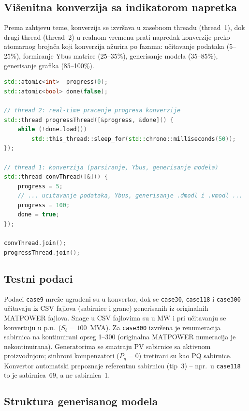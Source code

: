 \documentclass[12pt,oneside, a4paper]{book}
\begin{document}
\subsection{Višenitna konverzija sa indikatorom napretka}
 
Prema zahtjevu teme, konverzija se izvršava u zasebnom threadu (thread~1),
dok drugi thread (thread~2) u realnom vremenu prati napredak konverzije preko
atomarnog brojača koji konverzija ažurira po fazama: učitavanje podataka
(5--25\%), formiranje Ybus matrice (25--35\%), generisanje modela
(35--85\%), generisanje grafika (85--100\%).
 
\begin{lstlisting}[language=C++, style=cppstyle, caption={Višenitna organizacija konverzije}]
std::atomic<int>  progress(0);
std::atomic<bool> done(false);
 
// thread 2: real-time pracenje progresa konverzije
std::thread progressThread([&progress, &done]() {
    while (!done.load())
        std::this_thread::sleep_for(std::chrono::milliseconds(50));
});
 
// thread 1: konverzija (parsiranje, Ybus, generisanje modela)
std::thread convThread([&]() {
    progress = 5;
    // ... ucitavanje podataka, Ybus, generisanje .dmodl i .vmodl ...
    progress = 100;
    done = true;
});
 
convThread.join();
progressThread.join();
\end{lstlisting}
 
\subsection{Testni podaci}
 
Podaci \texttt{case9} mreže ugrađeni su u konvertor, dok se \texttt{case30},
\texttt{case118} i \texttt{case300} učitavaju iz CSV fajlova (sabirnice i
grane) generisanih iz originalnih MATPOWER fajlova. Snage u CSV fajlovima su
u MW i pri učitavanju se konvertuju u p.u.\ ($S_b = 100$~MVA). Za
\texttt{case300} izvršena je renumeracija sabirnica na kontinuirani opseg
1--300 (originalna MATPOWER numeracija je nekontinuirana). Generatorima se
smatraju PV sabirnice sa aktivnom proizvodnjom; sinhroni kompenzatori
($P_g = 0$) tretirani su kao PQ sabirnice. Konvertor automatski prepoznaje
referentnu sabirnicu (tip~3) -- npr.\ u \texttt{case118} to je sabirnica~69,
a ne sabirnica~1.
 
\subsection{Struktura generisanog modela}
 
\end{document}
